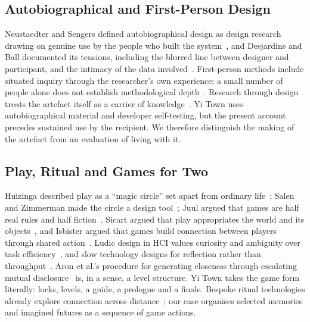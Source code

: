 \documentclass[sigconf,nonacm]{acmart}
\newcommand{\yt}{Yi Town}
\begin{document}
\subsection{Autobiographical and First-Person Design}
Neustaedter and Sengers defined autobiographical design as design research drawing on genuine
use by the people who built the system~\cite{neustaedter2012autobiographical}, and Desjardins
and Ball documented its tensions, including the blurred line between designer and
participant, and the intimacy of the data involved~\cite{desjardins2018tensions}. First-person
methods include situated inquiry through the researcher's own experience; a small
number of people alone does not establish methodological depth~\cite{lucero2019sample,desjardins2021firstperson}. Research through design treats the artefact itself as a carrier of
knowledge~\cite{zimmerman2007rtd,gaver2012expect}. \yt{} uses autobiographical material and developer self-testing, but the present account
precedes sustained use by the recipient. We therefore distinguish the making of the artefact
from an evaluation of living with it.

\subsection{Play, Ritual and Games for Two}
Huizinga described play as a ``magic circle'' set apart from ordinary life~\cite{huizinga1955homo};
Salen and Zimmerman made the circle a design tool~\cite{salen2004rules}; Juul argued that games
are half real rules and half fiction~\cite{juul2005halfreal}. Sicart argued that play
appropriates the world and its objects~\cite{sicart2014play}, and Isbister argued that games build
connection between players through shared action~\cite{isbister2016games}. Ludic design in HCI
values curiosity and ambiguity over task efficiency~\cite{gaver2004drift,gaver2003ambiguity}, and
slow technology designs for reflection rather than throughput~\cite{hallnas2001slow,odom2012technology}.
Aron et al.'s procedure for generating closeness through escalating mutual
disclosure~\cite{aron1997closeness} is, in a sense, a level structure. \yt{} takes the game form
literally: locks, levels, a guide, a prologue and a finale. Bespoke ritual technologies
already explore connection across distance~\cite{kirk2016ritual}; our case organises
selected memories and imagined futures as a sequence of game actions.
\end{document}
